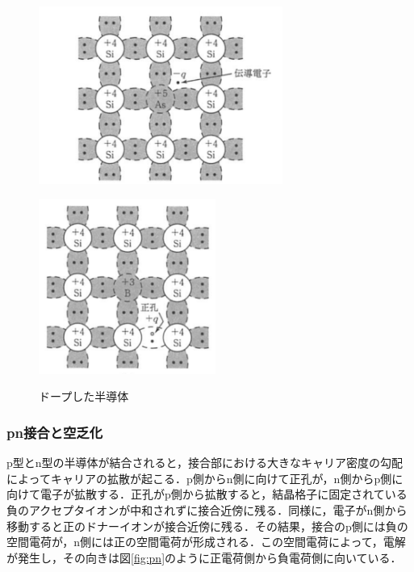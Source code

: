 \begin{figure}[h]
  \centering
  \begin{minipage}[b]{0.45\linewidth}
    \centering
    \includegraphics[width=8cm]{./figure/donner.png}
    \label{fig:Donner}
  \end{minipage}
  \begin{minipage}[b]{0.45\linewidth}
    \centering
    \includegraphics[width=5.8cm]{./figure/accepta.png}
    \label{fig:Acceptor}
  \end{minipage}
  \caption{ドープした半導体}
\end{figure}


\subsubsection*{pn接合と空乏化}
p型とn型の半導体が結合されると，接合部における大きなキャリア密度の勾配によってキャリアの拡散が起こる．p側からn側に向けて正孔が，n側からp側に向けて電子が拡散する．正孔がp側から拡散すると，結晶格子に固定されている負のアクセプタイオンが中和されずに接合近傍に残る．同様に，電子がn側から移動すると正のドナーイオンが接合近傍に残る．その結果，接合のp側には負の空間電荷が，n側には正の空間電荷が形成される．この空間電荷によって，電解が発生し，その向きは図\ref{fig:pn}のように正電荷側から負電荷側に向いている．\par

